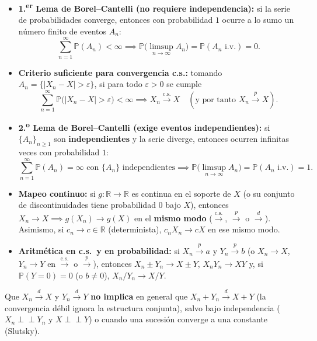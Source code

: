 \documentclass[10pt,a4paper]{article}
\newcommand{\Prob}{\mathbb{P}}
\newcommand{\R}{\mathbb{R}}
\newcommand{\ind}{\perp\!\!\!\perp}
\newcommand{\dto}{\xrightarrow{\;d\;}}
\newcommand{\pto}{\xrightarrow{\;p\;}}
\newcommand{\dcs}{\xrightarrow{\mathrm{c.s.}}}
\begin{document}
\begin{thmbox}[frametitle={Lemas de Borel--Cantelli y criterio suficiente c.s.}]
\begin{itemize}
  \item \textbf{1.\textsuperscript{er} Lema de Borel--Cantelli (no requiere independencia):} si la serie de probabilidades converge, entonces con probabilidad $1$ ocurre a lo sumo un número finito de eventos $A_n$:
  \[
  \sum_{n=1}^\infty \Prob(A_n) < \infty \implies \Prob\big(\limsup_{n\to\infty} A_n\big) = \Prob(A_n \text{ i.v.}) = 0.
  \]
  \item \textbf{Criterio suficiente para convergencia c.s.:} tomando $A_n = \{|X_n - X| > \varepsilon\}$, si para todo $\varepsilon > 0$ se cumple
  \[
  \sum_{n=1}^\infty \Prob\big(|X_n - X| > \varepsilon\big) < \infty \implies X_n \dcs X \quad (\text{y por tanto } X_n \pto X).
  \]
  \item \textbf{2.\textsuperscript{o} Lema de Borel--Cantelli (exige eventos independientes):} si $\{A_n\}_{n\ge 1}$ son \textbf{independientes} y la serie diverge, entonces ocurren infinitas veces con probabilidad $1$:
  \[
  \sum_{n=1}^\infty \Prob(A_n) = \infty \text{ con } \{A_n\} \text{ independientes} \implies \Prob\big(\limsup_{n\to\infty} A_n\big) = \Prob(A_n \text{ i.v.}) = 1.
  \]
\end{itemize}
\end{thmbox}

\begin{thmbox}[frametitle={Teorema del mapeo continuo y aritmética de límites}]
\begin{itemize}
  \item \textbf{Mapeo continuo:} si $g: \R \to \R$ es continua en el soporte de $X$ (o su conjunto de discontinuidades tiene probabilidad $0$ bajo $X$), entonces $X_n \to X \implies g(X_n) \to g(X)$ en el \textbf{mismo modo} ($\dcs$, $\pto$ o $\dto$). Asimismo, si $c_n \to c \in \R$ (determinista), $c_n X_n \to c X$ en ese mismo modo.
  \item \textbf{Aritmética en c.s.\ y en probabilidad:} si $X_n \pto a$ y $Y_n \pto b$ (o $X_n \to X$, $Y_n \to Y$ en $\dcs$ o $\pto$), entonces $X_n \pm Y_n \to X \pm Y$, $X_n Y_n \to XY$ y, si $\Prob(Y = 0) = 0$ (o $b \ne 0$), $X_n / Y_n \to X / Y$.
\end{itemize}
\end{thmbox}

\begin{warnbox}[frametitle={¡Cuidado con la suma en distribución!}]
Que $X_n \dto X$ y $Y_n \dto Y$ \textbf{no implica} en general que $X_n + Y_n \dto X + Y$ (la convergencia débil ignora la estructura conjunta), salvo bajo independencia ($X_n \ind Y_n$ y $X \ind Y$) o cuando una sucesión converge a una constante (Slutsky).
\end{warnbox}
\end{document}
